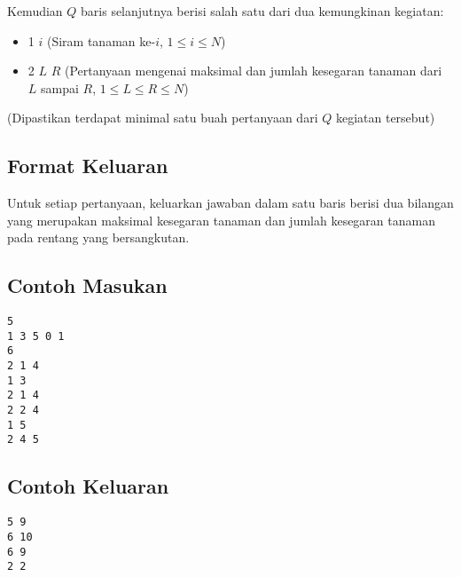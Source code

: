 \documentclass{article}
\begin{document}
Kemudian $Q$ baris selanjutnya berisi salah satu dari dua kemungkinan kegiatan:
\vspace{-\baselineskip}
\begin{itemize}
    \setlength\itemsep{0pt}
	\item 1 $i$ (Siram tanaman ke-$i$, $1 \leq i \leq N$)
	\item 2 $L$ $R$ (Pertanyaan mengenai maksimal dan jumlah kesegaran tanaman dari $L$ sampai $R$, $1 \leq L \leq R \leq N$)
\end{itemize}
\vspace{-\baselineskip}
(Dipastikan terdapat minimal satu buah pertanyaan dari $Q$ kegiatan tersebut)

\subsection*{Format Keluaran}

Untuk setiap pertanyaan, keluarkan jawaban dalam satu baris berisi dua bilangan yang merupakan maksimal kesegaran tanaman dan jumlah kesegaran tanaman pada rentang yang bersangkutan.

\begin{multicols}{2}
\subsection*{Contoh Masukan}
\begin{lstlisting}
5
1 3 5 0 1
6
2 1 4
1 3
2 1 4
2 2 4
1 5
2 4 5
\end{lstlisting}
\columnbreak
\subsection*{Contoh Keluaran}
\begin{lstlisting}
5 9
6 10
6 9
2 2

\end{lstlisting}
\vfill
\null
\end{multicols}


\pagebreak
\end{document}
